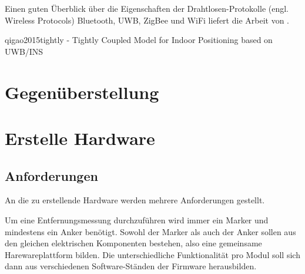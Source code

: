 \begin{comment}
Welche alternativen Technologien gibt es zu UWB?
\end{comment}

Einen guten Überblick über die Eigenschaften der Drahtlosen-Protokolle (engl. Wireless Protocols) Bluetooth, UWB, ZigBee und WiFi liefert die Arbeit \cite{lee2007comparative} von \citeauthor{lee2007comparative}.

qigao2015tightly - Tightly Coupled Model for Indoor Positioning based on UWB/INS


\begin{comment}
------------------------------------------------------------------------------------------
\end{comment}
\section{Gegenüberstellung}

\begin{comment}
Welche Eigenschaften haben die alternativen Technologien?
Warum hab ich mich für UWB entschieden?
\end{comment}


\begin{comment}
------------------------------------------------------------------------------------------
\end{comment}
\section{Erstelle Hardware}

\begin{comment}
------------------------------------------------------------------------------------------
- Datenübertragung zum Host
- Batteriebetrieb
- TODO: Erweiterbare Hardwareplattform
\end{comment}
\subsection{Anforderungen}

An die zu erstellende Hardware werden mehrere Anforderungen gestellt.

Um eine Entfernungsmessung durchzuführen wird immer ein Marker und mindestens ein Anker benötigt. Sowohl der Marker als auch der Anker sollen aus den gleichen elektrischen Komponenten bestehen, also eine gemeinsame Harewareplattform bilden. Die unterschiedliche Funktionalität pro Modul soll sich dann aus verschiedenen Software-Ständen der Firmware herausbilden.

